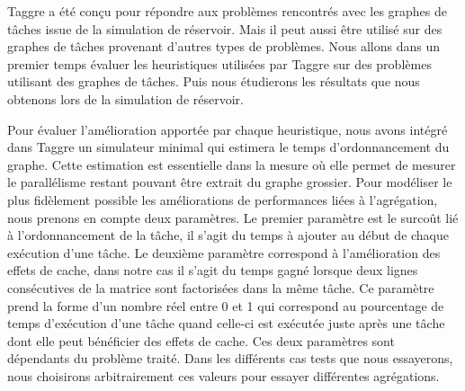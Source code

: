 Taggre a été conçu pour répondre aux problèmes rencontrés avec les graphes de tâches issue de la simulation de réservoir.
%
Mais il peut aussi être utilisé sur des graphes de tâches provenant d'autres types de problèmes.
%
Nous allons dans un premier temps évaluer les heuristiques utilisées par Taggre sur des problèmes utilisant des graphes de tâches.
%
Puis nous étudierons les résultats que nous obtenons lors de la simulation de réservoir.


Pour évaluer l'amélioration apportée par chaque heuristique, nous avons intégré dans Taggre un simulateur minimal qui estimera le temps d'ordonnancement du graphe.
%
Cette estimation est essentielle dans la mesure où elle permet de mesurer le parallélisme restant pouvant être extrait du graphe grossier.
%
Pour modéliser le plus fidèlement possible les améliorations de performances liées à l'agrégation, nous prenons en compte deux paramètres.
%
Le premier paramètre est le surcoût lié à l'ordonnancement de la tâche, il s'agit du temps à ajouter au début de chaque exécution d'une tâche.
%
Le deuxième paramètre correspond à l'amélioration des effets de cache, dans notre cas il s'agit du temps gagné lorsque deux lignes consécutives de la matrice sont factorisées dans la même tâche.
%
Ce paramètre prend la forme d'un nombre réel entre 0 et 1 qui correspond au pourcentage de temps d'exécution d'une tâche quand celle-ci est exécutée juste après une tâche dont elle peut bénéficier des effets de cache.
%
Ces deux paramètres sont dépendants du problème traité.
%
Dans les différents cas tests que nous essayerons, nous choisirons arbitrairement ces valeurs pour essayer différentes agrégations.
